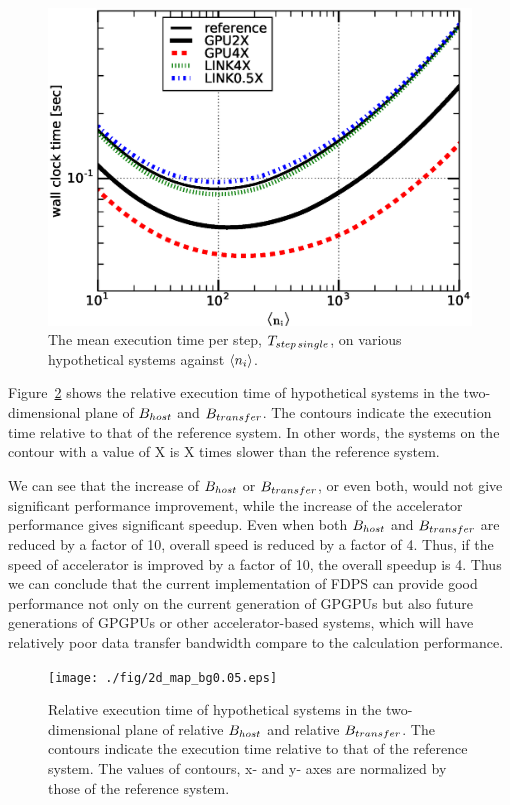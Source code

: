 \documentclass[dvipdfmx]{pasj01}
\begin{document}
\begin{figure}
  \begin{center}
    \includegraphics[width=16cm]{./fig/compare_total_hyp.eps}
  \end{center}
  \caption{The mean execution time per step, $T_{\rm step\, single}$,
    on various hypothetical systems against $\langle n_{\rm i}
    \rangle$.}
  \label{fig:compare_total_hyp}
\end{figure}

Figure~\ref{fig:2d_map} shows the relative execution time of
hypothetical systems in the two-dimensional plane of $B_{\rm host}$
and $B_{\rm transfer}$. The contours indicate the execution time
relative to that of the reference system. In other words, the systems
on the contour with a value of X is X times slower than the reference
system.

We can see that the increase of $B_{\rm host}$ or $B_{\rm transfer}$,
or even both, would not give significant performance improvement,
while the increase of the accelerator performance gives significant
speedup. Even when both $B_{\rm host}$ and $B_{\rm transfer}$ are
reduced by a factor of 10, overall speed is reduced by a factor of
4. Thus, if the speed of accelerator is improved by a factor of 10,
the overall speedup is 4.  Thus we can conclude that the current
implementation of FDPS can provide good performance not only on the
current generation of GPGPUs but also future generations of GPGPUs or
other accelerator-based systems, which will have relatively poor data
transfer bandwidth compare to the calculation performance.

\begin{figure}
  \texttt{[image: ./fig/2d\_map\_bg0.05.eps]}
  \caption{Relative execution time of hypothetical systems in the
    two-dimensional plane of relative $B_{\rm host}$ and relative
    $B_{\rm transfer}$. The contours indicate the execution time
    relative to that of the reference system. The values of contours,
    x- and y- axes are normalized by those of the reference system.}
  \label{fig:2d_map}
\end{figure}
\end{document}
